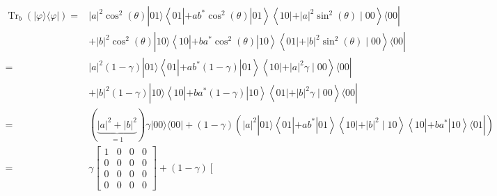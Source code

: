 \documentclass[10pt]{article}
\begin{document}
$$
  \begin{aligned}
    \operatorname{Tr}_{b}(|\varphi\rangle\langle\varphi|)= & |a|^{2} \cos ^{2}(\theta)|01\rangle\left\langle 01\left|+a b^{*} \cos ^{2}(\theta)\right| 01\right\rangle\left\langle\left. 10|+| a\right|^{2} \sin ^{2}(\theta) \mid 00\right\rangle\langle 00|                                                                                      \\
                                                           & +|b|^{2} \cos ^{2}(\theta)|10\rangle\left\langle 10\left|+b a^{*} \cos ^{2}(\theta)\right| 10\right\rangle\left\langle\left. 01|+| b\right|^{2} \sin ^{2}(\theta) \mid 00\right\rangle\langle 00|                                                                                     \\
    =                                                      & |a|^{2}(1-\gamma)|01\rangle\left\langle 01\left|+a b^{*}(1-\gamma)\right| 01\right\rangle\left\langle\left. 10|+| a\right|^{2} \gamma \mid 00\right\rangle\langle 00|                                                                                                                 \\
                                                           & +|b|^{2}(1-\gamma)|10\rangle\left\langle 10\left|+b a^{*}(1-\gamma)\right| 10\right\rangle\left\langle\left. 01|+| b\right|^{2} \gamma \mid 00\right\rangle\langle 00|                                                                                                                \\
    =                                                      & (\underbrace{|a|^{2}+|b|^{2}}_{=1}) \gamma|00\rangle\langle 00|+(1-\gamma)\left(|a|^{2}|01\rangle\left\langle 01\left|+a b^{*}\right| 01\right\rangle\left\langle\left. 10|+| b\right|^{2} \mid 10\right\rangle\left\langle 10\left|+b a^{*}\right| 10\right\rangle\langle 01|\right) \\
    =                                                      & \gamma\left[\begin{array}{cccc}
                                                                             1 & 0 & 0 & 0 \\
                                                                             0 & 0 & 0 & 0 \\
                                                                             0 & 0 & 0 & 0 \\
                                                                             0 & 0 & 0 & 0
                                                                           \end{array}\right]+(1-\gamma)\left[\begin{array}{cccc}

\end{array}
\end{aligned}$$
\end{document}
